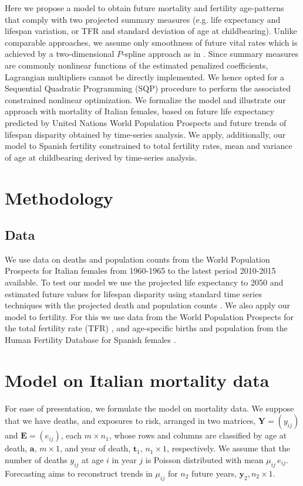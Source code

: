 \documentclass[12pt,a4paper,twoside]{article}
\begin{document}
Here we propose a model to obtain future mortality and fertility age-patterns that comply with two projected summary measures (e.g. life expectancy and lifespan variation, or TFR and standard deviation of age at childbearing). Unlike comparable approaches, we assume only smoothness of future vital rates which is achieved by a two-dimensional $P$-spline approach as in \citet{currie2004smoothing}. Since summary measures are commonly nonlinear functions of the estimated penalized coefficients, Lagrangian multipliers cannot be directly implemented. We hence opted for a Sequential Quadratic Programming (SQP) procedure \citep{nocedal2006sequential} to perform the associated constrained nonlinear optimization. We formalize the model and illustrate our approach with mortality of Italian females, based on future life expectancy predicted by United Nations World Population Prospects \citep{UN2017} and future trends of lifespan disparity obtained by time-series analysis. We apply, additionally, our model to Spanish fertility constrained to total fertility rates, mean and variance of age at childbearing derived by time-series analysis.

\section{Methodology}

\subsection{Data}
We use data on deaths and population counts from the World Population Prospects for Italian females from 1960-1965 to the latest period 2010-2015 available. To test our model we use the projected life expectancy to 2050 and estimated future values for lifespan disparity using standard time series techniques with the projected death and population counts \citep{UN2017}. We also apply our model to fertility. For this we use data from the World Population Prospects for the total fertility rate (TFR) \citep{UN2017}, and age-specific births and population from the Human Fertility Database for Spanish females \cite{HFD}.


\section{Model on Italian mortality data}

For ease of presentation, we formulate the model on mortality data. We suppose that we have deaths, and exposures to risk, arranged in two matrices, 
$\bm{Y} = (y_{ij})$ and $\bm{E} = (e_{ij})$, each $m \times n_{1}$, whose rows and columns are classified by age at death, $\bm{a}, \,m \times 1$, and year of death, $\bm{t}_{1}, \,n_{1} \times 1$, respectively.  
We assume that the number of deaths $y_{ij}$ at age $i$ in year $j$ is Poisson distributed with mean $\mu_{ij} \,e_{ij}$. %
Forecasting aims to reconstruct trends in $\mu_{ij}$ for $n_{2}$ future years, $\bm{y}_{2}, n_{2} \times 1$.
\end{document}
